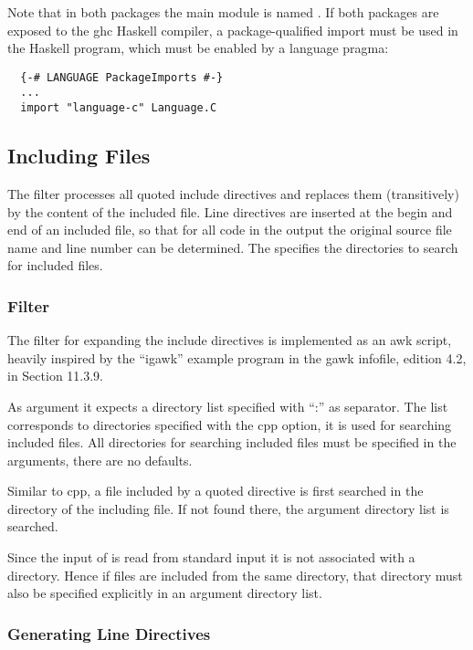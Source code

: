 Note that in both packages the main module is named . If both packages are exposed to the ghc Haskell
compiler, a package-qualified import must be used in the Haskell program, which must be enabled by a language pragma:
\begin{verbatim}
  {-# LANGUAGE PackageImports #-}
  ...
  import "language-c" Language.C
\end{verbatim}

\subsection{Including Files}
\label{impl-ccode-include}

The filter  processes all quoted include directives and replaces them (transitively) by the 
content of the included file. Line directives are inserted at the begin and end of an included file, so that
for all code in the output the original source file name and line number can be determined. The 
specifies the directories to search for included files.

\subsubsection{Filter }

The filter for expanding the include directives is implemented as an awk script, heavily inspired by the ``igawk''
example program in the gawk infofile, edition 4.2, in Section 11.3.9.

As argument it expects a directory list specified with ``:'' as separator. The list corresponds
to directories specified with the  cpp option, it is used for searching included files.
All directories for searching included files must be specified in the arguments, there are no defaults.

Similar to cpp, a file included by a quoted directive is first searched in the directory of the including file. 
If not found there, the argument directory list is searched.

Since the input of  is read from standard input it is not associated with a directory. Hence
if files are included from the same directory, that directory must also be specified explicitly in an argument directory
list.

\subsubsection{Generating Line Directives}

